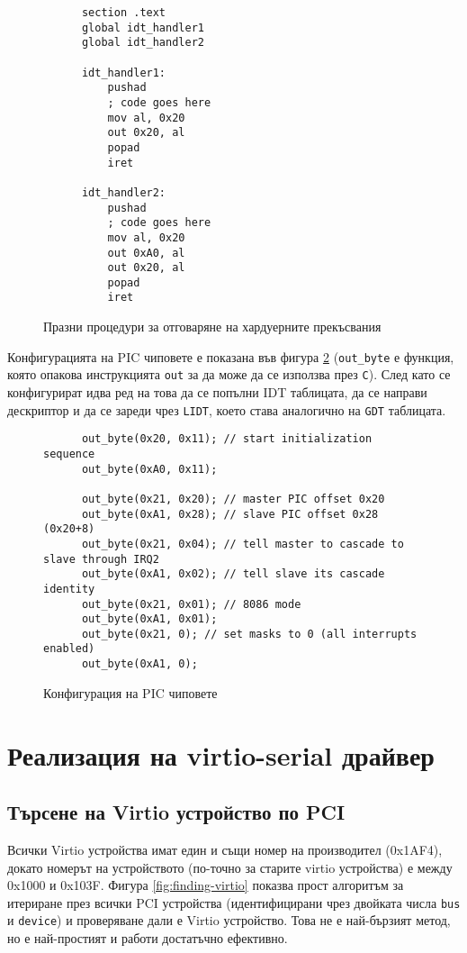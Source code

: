   \begin{figure}[ht]
    \centering
    \begin{verbatim}
      section .text
      global idt_handler1
      global idt_handler2

      idt_handler1:
          pushad
          ; code goes here
          mov al, 0x20
          out 0x20, al
          popad
          iret

      idt_handler2:
          pushad
          ; code goes here
          mov al, 0x20
          out 0xA0, al
          out 0x20, al
          popad
          iret
    \end{verbatim}
    \caption{Празни процедури за отговаряне на хардуерните прекъсвания}
    \label{fig:irqhandlers}
  \end{figure}

  Конфигурацията на PIC чиповете е показана във фигура \ref{fig:picconfig} ({\tt out\_byte} е функция, която опакова инструкцията {\tt out} за да може да се използва през {\tt C}). След като се конфигурират идва ред на това да се попълни IDT таблицата, да се направи дескриптор и да се зареди чрез {\tt LIDT}, което става аналогично на {\tt GDT} таблицата.

  \begin{figure}[ht]
    \centering
    \begin{verbatim}
      out_byte(0x20, 0x11); // start initialization sequence
      out_byte(0xA0, 0x11);

      out_byte(0x21, 0x20); // master PIC offset 0x20
      out_byte(0xA1, 0x28); // slave PIC offset 0x28 (0x20+8)
      out_byte(0x21, 0x04); // tell master to cascade to slave through IRQ2
      out_byte(0xA1, 0x02); // tell slave its cascade identity
      out_byte(0x21, 0x01); // 8086 mode
      out_byte(0xA1, 0x01);
      out_byte(0x21, 0); // set masks to 0 (all interrupts enabled)
      out_byte(0xA1, 0);
    \end{verbatim}
    \caption{Конфигурация на PIC чиповете}
    \label{fig:picconfig}
  \end{figure}

\section{Реализация на virtio-serial драйвер}
  \subsection{Търсене на Virtio устройство по PCI}
  Всички Virtio устройства имат един и същи номер на производител (0x1AF4), докато номерът на устройството (по-точно за старите virtio устройства) е между 0x1000 и 0x103F. Фигура \ref{fig:finding-virtio} показва прост алгоритъм за итериране през всички PCI устройства (идентифицирани чрез двойката числа {\tt bus} и {\tt device}) и проверяване дали е Virtio устройство. Това не е най-бързият метод, но е най-простият и работи достатъчно ефективно.

